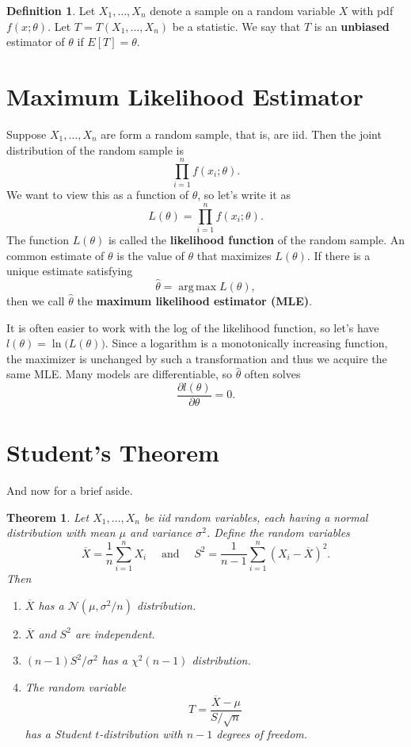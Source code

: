 \documentclass[12pt]{article}
\newcommand{\sumn}{\sum_{i=1}^n}
\newcommand{\xbar}{\overline{X}}
\DeclareMathOperator*{\argmax}{arg\,max}
\newcommand{\normal}[2]{\mathcal{N} \left({#1}, {#2} \right)}
\newtheorem{theorem}{Theorem}
\theoremstyle{definition}
\newtheorem{definition}{Definition}
\begin{document}
	
\begin{definition}
	Let $X_1, \hdots, X_n$ denote  a sample on a random variable $X$ with pdf $f(x;\theta)$. Let $T=T(X_1, \hdots, X_n)$ be a statistic. We say that $T$ is an \textbf{unbiased} estimator of $\theta$ if $E[T]=\theta$. 
\end{definition}
	
	
	
\section{Maximum Likelihood Estimator}

Suppose $X_1, \hdots, X_n$ are form a random sample, that is, are iid. Then the joint distribution of the random sample is
	\[\prod_{i=1}^n f(x_i; \theta).	\]
We want to view this as a function of $\theta$, so let's write it as
	\[L(\theta) = 	\prod_{i=1}^n f(x_i; \theta). \]
The function $L(\theta)$ is called the \textbf{likelihood function} of the random sample. An common estimate of $\theta$ is the value of $\theta$ that maximizes $L(\theta)$. If there is a unique estimate satisfying
	\[\hat{\theta} = \argmax L(\theta),	\]
then we call $\hat{\theta}$ the \textbf{maximum likelihood estimator (MLE)}. 

It is often easier to work with the log of the likelihood function, so let's have $l(\theta) = \ln \big( L(\theta) \big)$. Since a logarithm is a monotonically increasing function, the maximizer is unchanged by such a transformation and thus we acquire the same MLE. Many models are differentiable, so $\hat{\theta}$ often solves
	\[\frac{\partial l(\theta)}{\partial \theta}=0.	\]



\section{Student's Theorem}
And now for a brief aside.

\begin{theorem} Let $X_1, \hdots, X_n$ be iid random variables, each having a normal distribution with mean $\mu$ and variance $\sigma^2$. Define the random variables
	\[\overline{X} = \frac{1}{n} \sumn X_i \quad \text{ and } \quad 	S^2 = \frac{1}{n-1} \sumn (X_i - \overline{X})^2.\]
Then
	\begin{enumerate}
		\item $\overline{X}$ has a $\normal{\mu}{\sigma^2/n}$ distribution. 
		\item $\xbar$ and $S^2$ are independent.
		\item $(n-1)S^2/\sigma^2$ has a $\chi^2(n-1)$ distribution.
		\item The random variable
			\[T = \frac{\xbar - \mu}{S / \sqrt{n}}	\]
			has a Student $t$-distribution with $n-1$ degrees of freedom. 
	\end{enumerate}
\end{theorem}
\end{document}
